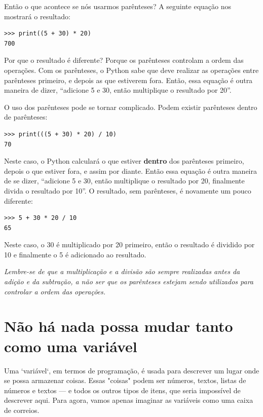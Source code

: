 \noindent
Então o que acontece se nós usarmos parênteses? A seguinte equação nos mostrará o resultado:

\begin{listing}
\begin{verbatim}
>>> print((5 + 30) * 20)
700
\end{verbatim}
\end{listing}

\noindent
Por que o resultado é diferente? Porque os parênteses controlam a ordem das operações. Com os parênteses, o Python sabe que deve realizar as operações entre parênteses primeiro, e depois as que estiverem fora. Então, essa equação é outra maneira de dizer, ``adicione 5 e 30, então multiplique o resultado por 20''.

O uso dos parênteses pode se tornar complicado. Podem existir parênteses dentro de parênteses:

\begin{listing}
\begin{verbatim}
>>> print(((5 + 30) * 20) / 10)
70
\end{verbatim}
\end{listing}

\noindent
Neste caso, o Python calculará o que estiver \textbf{dentro} dos parênteses primeiro, depois o que estiver fora, e assim por diante. Então essa equação é outra maneira de se dizer, ``adicione 5 e 30, então multiplique o resultado por 20, finalmente divida o resultado por 10''. O resultado, sem parênteses, é novamente um pouco diferente:

\begin{listing}
\begin{verbatim}
>>> 5 + 30 * 20 / 10
65
\end{verbatim}
\end{listing}

Neste caso, o 30 é multiplicado por 20 primeiro, então o resultado é dividido por 10 e finalmente o 5 é adicionado ao resultado.

\emph{Lembre-se de que a multiplicação e a divisão são sempre realizadas antes da adição e da subtração, a não ser que os parênteses estejam sendo utilizados para controlar a ordem das operações.}

\section{Não há nada possa mudar tanto como uma variável}

Uma `variável`, em termos de programação, é usada para descrever um lugar onde se possa armazenar coisas. Essas "coisas" podem ser números, textos, listas de números e textos --- e todos os outros tipos de itens, que seria impossível de descrever aqui. Para agora, vamos apenas imaginar as variáveis como uma caixa de correios.

